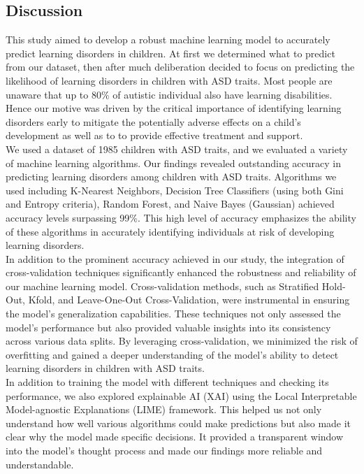 \documentclass{article}
\begin{document}
\vspace{1\baselineskip}
\begin{multicols}{2}

\section{Discussion}
\hspace*{\parindent} This study aimed to develop a robust machine learning model to accurately predict learning disorders in children. At first we determined what to predict from our dataset, then after much deliberation decided to focus on predicting the likelihood of learning disorders in children with ASD traits. Most people are unaware that up to 80\% of autistic individual also have learning disabilities. Hence our motive was driven by the critical importance of identifying learning disorders early to mitigate the potentially adverse effects on a child's development as well as to to provide effective treatment and support. \\
\hspace*{\parindent} We used a dataset of 1985 children with ASD traits, and we evaluated a variety of machine learning algorithms. Our findings revealed outstanding accuracy in predicting learning disorders among children with ASD traits. Algorithms we used including K-Nearest Neighbors, Decision Tree Classifiers (using both Gini and Entropy criteria), Random Forest, and Naive Bayes (Gaussian) achieved accuracy levels surpassing 99\%. This high level of accuracy emphasizes the ability of these algorithms in accurately identifying individuals at risk of developing learning disorders.\\
\hspace*{\parindent} In addition to the prominent accuracy achieved in our study, the integration of cross-validation techniques significantly enhanced the robustness and reliability of our machine learning model. Cross-validation methods, such as Stratified Hold-Out, Kfold, and Leave-One-Out Cross-Validation, were instrumental in ensuring the model's generalization capabilities. These techniques not only assessed the model's performance but also provided valuable insights into its consistency across various data splits. By leveraging cross-validation, we minimized the risk of overfitting and gained a deeper understanding of the model's ability to detect learning disorders in children with ASD traits.\\
\hspace*{\parindent} In addition to training the model with different techniques and checking its performance, we also explored explainable AI (XAI) using the Local Interpretable Model-agnostic Explanations (LIME) framework. This helped us not only understand how well various algorithms could make predictions but also made it clear why the model made specific decisions. It provided a transparent window into the model's thought process and made our findings more reliable and understandable.\\

\end{multicols}
\end{document}
